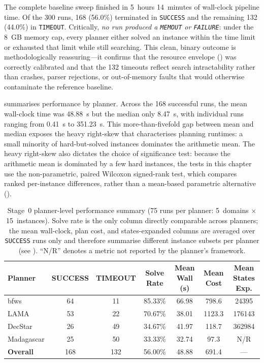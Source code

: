 The complete baseline sweep finished in 5~hours 14~minutes of wall-clock pipeline time.
Of the 300 runs, 168 (56.0\%) terminated in \texttt{SUCCESS} and the remaining 132 (44.0\%) in \texttt{TIMEOUT}.
Critically, \emph{no run produced a \texttt{MEMOUT} or \texttt{FAILURE}}: under the 8~GB memory cap, every planner either solved an instance within the time limit or exhausted that limit while still searching.
This clean, binary outcome is methodologically reassuring---it confirms that the resource envelope () was correctly calibrated and that the 132 timeouts reflect search intractability rather than crashes, parser rejections, or out-of-memory faults that would otherwise contaminate the reference baseline.

 summarises performance by planner.
Across the 168 successful runs, the mean wall-clock time was 48.88~s but the median only 8.47~s, with individual runs ranging from 0.41~s to 351.23~s.
This more-than-fivefold gap between mean and median exposes the heavy right-skew that characterises planning runtimes: a small minority of hard-but-solved instances dominates the arithmetic mean.
The heavy right-skew also dictates the choice of significance test: because the arithmetic mean is dominated by a few hard instances, the tests in this chapter use the non-parametric, paired Wilcoxon signed-rank test, which compares ranked per-instance differences, rather than a mean-based parametric alternative ().

\begin{table}[htbp]
  \centering
  \caption{Stage~0 planner-level performance summary (75 runs per planner: 5~domains $\times$ 15~instances). Solve rate is the only column directly comparable across planners; the mean wall-clock, plan cost, and states-expanded columns are averaged over \texttt{SUCCESS} runs only and therefore summarise different instance subsets per planner (see ). ``N/R'' denotes a metric not reported by the planner's framework.}
  \label{tab:s0_planner_summary}
  \small
  \begin{tabular}{l c c c c c c}
    \toprule
    \textbf{Planner} & \textbf{SUCCESS} & \textbf{TIMEOUT} & \textbf{Solve Rate} & \textbf{Mean Wall (s)} & \textbf{Mean Cost} & \textbf{Mean States Exp.} \\
    \midrule
    \gls{bfws}  & 64 & 11 & 85.33\% & 66.98 & 798.6  & \num{24395} \\
    LAMA  & 53 & 22 & 70.67\% & 38.01 & 1123.3 & \num{176143} \\
    DecStar     & 26 & 49 & 34.67\% & 41.97 & 118.7  & \num{362984} \\
    Madagascar  & 25 & 50 & 33.33\% & 32.74 & 97.3   & N/R \\
    \midrule
    \textbf{Overall} & 168 & 132 & 56.00\% & 48.88 & 691.4 & --- \\
    \bottomrule
  \end{tabular}
\end{table}

